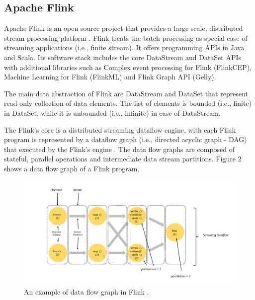 \documentclass[]{article}
\begin{document}
\subsection{Apache Flink}

\par Apache Flink is an open source project that provides a large-scale, distributed stream processing platform \cite{flink}. Flink treats the batch processing as special case of streaming applications (i.e., finite stream).
It offers programming APIs in Java and Scala. Its software stack includes the core DataStream and DataSet APIs with additional libraries such as Complex event processing for Flink (FlinkCEP), Machine Learning for Flink (FlinkML)  and Flink Graph API (Gelly).

\par The main data abstraction of Flink are DataStream and DataSet that represent read-only collection of data elements. The list of elements is bounded (i.e., finite) in DataSet, while it is unbounded (i.e., infinite) in case of DataStream.

\par The Flink's core is a distributed streaming dataflow engine,  with each Flink program is represented by a dataflow graph (i.e., directed acyclic graph - DAG) that executed by the Flink's engine \cite{flink_paper}. The data flow graphs are composed of stateful, parallel operations and intermediate data stream partitions. Figure 2 shows a data flow graph of a Flink program.


\begin{figure}[h]
 
  \centering
    \includegraphics[width=\textwidth, height=.3\textheight]{flink_engine.png}
     \caption{ An example of data flow graph in Flink \cite{flink}.}
\end{figure} 
\end{document}
